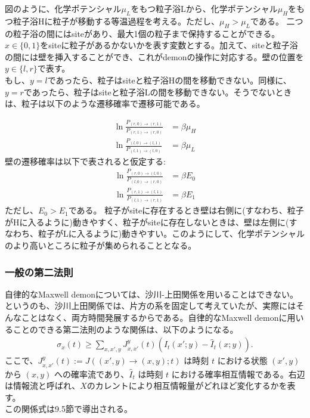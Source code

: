 \documentclass[a4paper,11pt]{jsarticle}
\numberwithin{equation}{section}
\begin{document}
図のように、化学ポテンシャル$\mu_L$をもつ粒子浴Lから、化学ポテンシャル$\mu_H$をもつ粒子浴Hに粒子が移動する等温過程を考える。ただし、$\mu_H > \mu_L$である。
二つの粒子浴の間にはsiteがあり、最大1個の粒子まで保持することができる。\\
$x \in \{0,1\}$をsiteに粒子があるかないかを表す変数とする。加えて、siteと粒子浴の間には壁を挿入することができ、これがdemonの操作に対応する。壁の位置を$y \in \{l,r\}$で表す。\\
もし、$y =l$であったら、粒子はsiteと粒子浴Hの間を移動できない。同様に、$y = r$であったら、粒子はsiteと粒子浴Lの間を移動できない。そうでないときは、粒子は以下のような遷移確率で遷移可能である。

\begin{align}
    \ln \frac{P_{(r,0) \to (r,1)}}{P_{(r,1) \to (r,0)}} &= \beta \mu_H \\
    \ln \frac{P_{(l,0) \to (l,1)}}{P_{(l,1) \to (l,0)}} &= \beta \mu_L 
\end{align}
壁の遷移確率は以下で表されると仮定する:
\begin{align}
    \ln \frac{P_{(r,0) \to (l,0)}}{P_{(l,0) \to (r,0)}} &= \beta E_0 \\
    \ln \frac{P_{(r,1) \to (l,1)}}{P_{(l,1) \to (r,1)}} &= \beta E_1 
\end{align}
ただし、$E_0 > E_1$である。%
粒子がsiteに存在するとき壁は右側に(すなわち、粒子がHに入るように)動きやすく、粒子がsiteに存在しないときは、壁は左側に(すなわち、粒子がLに入るように)動きやすい。このようにして、化学ポテンシャルのより高いところに粒子が集められることとなる。\\


\subsubsection{一般の第二法則}
自律的なMaxwell demonについては、沙川-上田関係を用いることはできない。というのも、沙川上田関係では、片方の系を固定して考えていたが、実際にはそんなことはなく、両方時間発展するからである。自律的なMaxwell demonに用いることのできる第二法則のような関係は、以下のようになる。
\begin{align}
    \sigma_x(t) \geq \sum_{x,x',y} J^y_{x,x'}(t) \left( \hat{I}_t(x'; y) - \hat{I}_t(x; y) \right). \tag{9.44}
\end{align}
ここで、\(J^y_{x,x'}(t) := J((x', y) \to (x, y); t)\) は時刻 \(t\) における状態 \((x', y)\) から \((x, y)\) への確率流であり、\(\hat{I}_t\) は時刻 \(t\) における確率相互情報である。右辺は情報流と呼ばれ、$X$のカレントにより相互情報量がどれほど変化するかを表す。\\
この関係式は9.5節で導出される。\\
\end{document}
